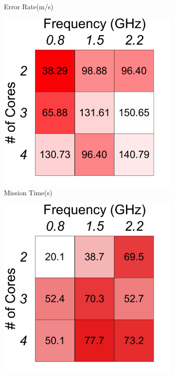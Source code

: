 {\begin{figure}[t!]
\begin{subfigure}[t!]{.3\columnwidth}
    \caption{Error Rate(m/s)}
     \label{fig:benchmarks:OPA:ap:velocity}
    \end{subfigure}
    \begin{subfigure}[t!]{.3\columnwidth}
    \centering
    \includegraphics[width=\columnwidth]{figs/aerial_photography_flight_time_operating_point}
    \caption{Mission Time(s)}
    \label{fig:benchmarks:OPA:ap:time}
    \end{subfigure}
    \begin{subfigure}[t!]{.3\columnwidth}
    \centering
    \includegraphics[width=\columnwidth] {figs/aerial_photography_energy_operating_point}

\end{subfigure}
\end{figure}}
